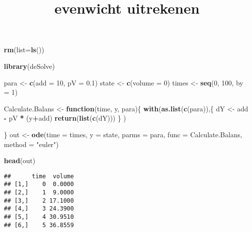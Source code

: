 \documentclass[]{article}
\title{evenwicht uitrekenen}
\author{}
\date{}
\newenvironment{Shaded}{\begin{snugshade}}{\end{snugshade}}
\newcommand{\KeywordTok}[1]{\textcolor[rgb]{0.13,0.29,0.53}{\textbf{#1}}}
\newcommand{\DataTypeTok}[1]{\textcolor[rgb]{0.13,0.29,0.53}{#1}}
\newcommand{\DecValTok}[1]{\textcolor[rgb]{0.00,0.00,0.81}{#1}}
\newcommand{\FloatTok}[1]{\textcolor[rgb]{0.00,0.00,0.81}{#1}}
\newcommand{\StringTok}[1]{\textcolor[rgb]{0.31,0.60,0.02}{#1}}
\newcommand{\ControlFlowTok}[1]{\textcolor[rgb]{0.13,0.29,0.53}{\textbf{#1}}}
\newcommand{\OperatorTok}[1]{\textcolor[rgb]{0.81,0.36,0.00}{\textbf{#1}}}
\newcommand{\NormalTok}[1]{#1}
\begin{document}
\maketitle

\begin{Shaded}
\begin{Highlighting}[]
\KeywordTok{rm}\NormalTok{(}\DataTypeTok{list=}\KeywordTok{ls}\NormalTok{())}
\end{Highlighting}
\end{Shaded}

\begin{Shaded}
\begin{Highlighting}[]
\KeywordTok{library}\NormalTok{(deSolve)}

\NormalTok{para <-}\StringTok{ }\KeywordTok{c}\NormalTok{(}\DataTypeTok{add =} \DecValTok{10}\NormalTok{, }\DataTypeTok{pV =} \FloatTok{0.1}\NormalTok{)}
\NormalTok{state <-}\StringTok{ }\KeywordTok{c}\NormalTok{(}\DataTypeTok{volume =} \DecValTok{0}\NormalTok{)}
\NormalTok{times <-}\StringTok{ }\KeywordTok{seq}\NormalTok{(}\DecValTok{0}\NormalTok{, }\DecValTok{100}\NormalTok{,  }\DataTypeTok{by =} \DecValTok{1}\NormalTok{)}

\NormalTok{Calculate.Balans <-}\StringTok{ }\ControlFlowTok{function}\NormalTok{(time, y, para)\{}
 \KeywordTok{with}\NormalTok{(}\KeywordTok{as.list}\NormalTok{(}\KeywordTok{c}\NormalTok{(para)),\{}
\NormalTok{         dY <-}\StringTok{ }\NormalTok{add }\OperatorTok{-}\StringTok{ }\NormalTok{pV }\OperatorTok{*}\StringTok{ }\NormalTok{(y}\OperatorTok{+}\NormalTok{add)}
         \KeywordTok{return}\NormalTok{(}\KeywordTok{list}\NormalTok{(}\KeywordTok{c}\NormalTok{(dY)))}
\NormalTok{       \}}
\NormalTok{       )}
  
\NormalTok{\}}
\NormalTok{out <-}\StringTok{ }\KeywordTok{ode}\NormalTok{(}\DataTypeTok{time =}\NormalTok{ times,}
           \DataTypeTok{y =}\NormalTok{ state,}
           \DataTypeTok{parms =}\NormalTok{ para,}
           \DataTypeTok{func =}\NormalTok{ Calculate.Balans,}
           \DataTypeTok{method =} \StringTok{"euler"}\NormalTok{)}

\KeywordTok{head}\NormalTok{(out)}
\end{Highlighting}
\end{Shaded}

\begin{verbatim}
##      time  volume
## [1,]    0  0.0000
## [2,]    1  9.0000
## [3,]    2 17.1000
## [4,]    3 24.3900
## [5,]    4 30.9510
## [6,]    5 36.8559
\end{verbatim}
\end{document}
